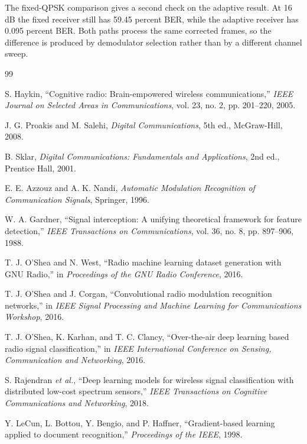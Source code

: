 \documentclass[12pt,twoside,openright]{report}
\begin{document}
The fixed-QPSK comparison gives a second check on the adaptive result. At
16 dB the fixed receiver still has 59.45 percent BER, while the adaptive
receiver has 0.095 percent BER. Both paths process the same corrected
frames, so the difference is produced by demodulator selection rather than
by a different channel sweep.

\renewcommand{\bibname}{References}
\StartRef
\begin{thebibliography}{99}

S. Haykin, ``Cognitive radio: Brain-empowered wireless communications,''
\textit{IEEE Journal on Selected Areas in Communications}, vol. 23, no. 2,
pp. 201--220, 2005.

J. G. Proakis and M. Salehi, \textit{Digital Communications}, 5th ed.,
McGraw-Hill, 2008.

B. Sklar, \textit{Digital Communications: Fundamentals and Applications},
2nd ed., Prentice Hall, 2001.

E. E. Azzouz and A. K. Nandi,
\textit{Automatic Modulation Recognition of Communication Signals},
Springer, 1996.

W. A. Gardner, ``Signal interception: A unifying theoretical framework for
feature detection,'' \textit{IEEE Transactions on Communications}, vol. 36,
no. 8, pp. 897--906, 1988.

T. J. O'Shea and N. West, ``Radio machine learning dataset generation with
GNU Radio,'' in \textit{Proceedings of the GNU Radio Conference}, 2016.

T. J. O'Shea and J. Corgan, ``Convolutional radio modulation recognition
networks,'' in \textit{IEEE Signal Processing and Machine Learning for
Communications Workshop}, 2016.

T. J. O'Shea, K. Karhan, and T. C. Clancy, ``Over-the-air deep learning
based radio signal classification,'' in \textit{IEEE International
Conference on Sensing, Communication and Networking}, 2016.

S. Rajendran \textit{et al.}, ``Deep learning models for wireless signal
classification with distributed low-cost spectrum sensors,''
\textit{IEEE Transactions on Cognitive Communications and Networking}, 2018.

Y. LeCun, L. Bottou, Y. Bengio, and P. Haffner, ``Gradient-based learning
applied to document recognition,'' \textit{Proceedings of the IEEE}, 1998.


\end{thebibliography}
\end{document}
